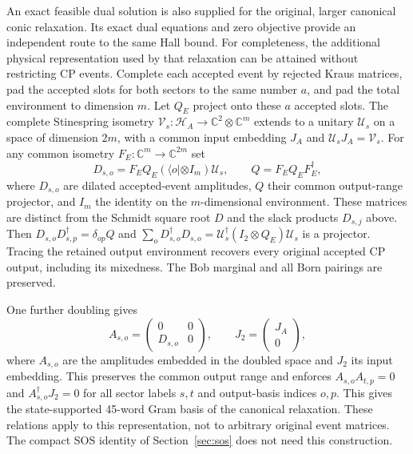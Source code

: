 \documentclass[11pt]{article}
\begin{document}
An exact feasible dual solution is also supplied for the original, larger canonical conic relaxation. Its exact dual equations and zero objective provide an independent route to the same Hall bound. For completeness, the additional physical representation used by that relaxation can be attained without restricting CP events. Complete each accepted event by rejected Kraus matrices, pad the accepted slots for both sectors to the same number $a$, and pad the total environment to dimension $m$. Let $Q_E$ project onto these $a$ accepted slots. The complete Stinespring isometry $\mathcal V_s:\mathcal H_A\to\mathbb C^2\otimes\mathbb C^m$ extends to a unitary $\mathcal U_s$ on a space of dimension $2m$, with a common input embedding $J_A$ and $\mathcal U_sJ_A=\mathcal V_s$. For any common isometry $F_E:\mathbb C^m\to\mathbb C^{2m}$ set
\begin{equation}
 D_{s,o}=F_EQ_E(\langle o|\otimes I_m)\mathcal U_s,\qquad
 Q=F_EQ_EF_E^\dagger,
 \label{eq:common-range-dilation}
\end{equation}
where $D_{s,o}$ are dilated accepted-event amplitudes, $Q$ their common output-range projector, and $I_m$ the identity on the $m$-dimensional environment. These matrices are distinct from the Schmidt square root $D$ and the slack products $D_{s,j}$ above. Then $D_{s,o}D_{s,p}^\dagger=\delta_{op}Q$ and
$\sum_oD_{s,o}^\dagger D_{s,o}=\mathcal U_s^\dagger(I_2\otimes Q_E)\mathcal U_s$ is a projector. Tracing the retained output environment recovers every original accepted CP output, including its mixedness. The Bob marginal and all Born pairings are preserved.

One further doubling gives
\begin{equation}
 A_{s,o}=\begin{pmatrix}0&0\\D_{s,o}&0\end{pmatrix},\qquad
 J_2=\begin{pmatrix}J_A\\0\end{pmatrix},
 \label{eq:nilpotent-dilation}
\end{equation}
where $A_{s,o}$ are the amplitudes embedded in the doubled space and $J_2$ its input embedding. This preserves the common output range and enforces
$A_{s,o}A_{t,p}=0$ and $A_{s,o}^\dagger J_2=0$ for all sector labels $s,t$ and output-basis indices $o,p$. This gives the state-supported 45-word Gram basis of the canonical relaxation. These relations apply to this representation, not to arbitrary original event matrices. The compact SOS identity of Section~\ref{sec:sos} does not need this construction.
\end{document}
